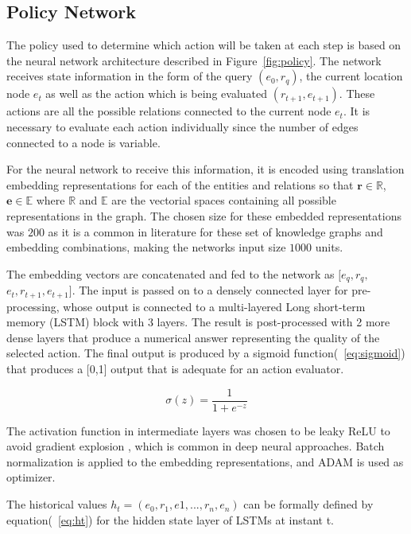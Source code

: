 \subsection{Policy Network}
\label{sec:policy}
The policy used to determine which action will be taken at each step is based on the neural network architecture described in Figure~\ref{fig:policy}. The network receives state information in the form of the query $(e_0,r_q)$, the current location node $e_t$ as well as the action which is being evaluated $(r_{t+1}, e_{t+1})$. These actions are all the possible relations connected to the current node $e_t$. It is necessary to evaluate each action individually since the number of edges connected to a node is variable.

For the neural network to receive this information, it is encoded using translation embedding representations for each of the entities and relations so that  $\textbf{r} \in \mathbb{R}$, $\textbf{e} \in \mathbb{E}$ where $\mathbb{R}$ and $\mathbb{E}$ are the vectorial spaces containing all possible representations in the graph. The chosen size for these embedded representations was $200$ as it is a common in literature for these set of knowledge graphs and embedding combinations, making the networks input size $1000$ units.

The embedding vectors are concatenated and fed to the network as $[e_q,r_q,$ \\$e_t,r_{t+1},e_{t+1}]$. The input is passed on to a densely connected layer for pre-processing, whose output is connected to a multi-layered Long short-term memory (LSTM)
 block with 3 layers. The result is post-processed with 2 more dense layers that produce a numerical answer representing the quality of the selected action. The final output is produced by a sigmoid function(~\ref{eq:sigmoid}) that produces a [0,1] output that is adequate for an action evaluator.

\begin{equation}
\label{eq:sigmoid}
    \sigma(z) = \frac{1} {1 + e^{-z}}
\end{equation}

The activation function in intermediate layers was chosen to be leaky ReLU to avoid gradient explosion
, which is common in deep neural approaches. Batch normalization is applied to the embedding representations, and ADAM
is used as optimizer. 

The historical values $h_t = (e_0,r_1,e1,...,r_n,e_n)$ can be formally defined by equation(~\ref{eq:ht}) for the hidden state layer of LSTMs at instant t.


